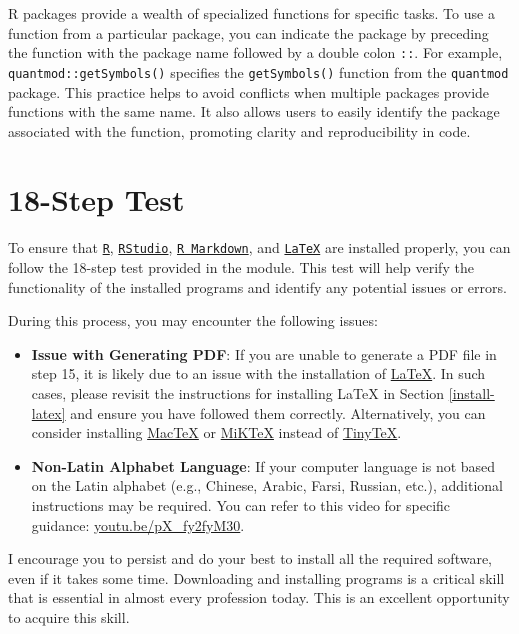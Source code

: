 \documentclass[
]{book}
\begin{document}
R packages provide a wealth of specialized functions for specific tasks. To use a function from a particular package, you can indicate the package by preceding the function with the package name followed by a double colon \texttt{::}. For example, \texttt{quantmod::getSymbols()} specifies the \texttt{getSymbols()} function from the \texttt{quantmod} package. This practice helps to avoid conflicts when multiple packages provide functions with the same name. It also allows users to easily identify the package associated with the function, promoting clarity and reproducibility in code.

\hypertarget{step-test}{%
\section{18-Step Test}\label{step-test}}

To ensure that \href{https://www.r-project.org/}{\texttt{R}}, \href{https://rstudio.com/}{\texttt{RStudio}}, \href{https://rmarkdown.rstudio.com/}{\texttt{R\ Markdown}}, and \href{https://www.latex-project.org/}{\texttt{LaTeX}} are installed properly, you can follow the 18-step test provided in the module. This test will help verify the functionality of the installed programs and identify any potential issues or errors.

During this process, you may encounter the following issues:

\begin{itemize}
\item
  \textbf{Issue with Generating PDF}: If you are unable to generate a PDF file in step 15, it is likely due to an issue with the installation of \href{https://www.latex-project.org/}{LaTeX}. In such cases, please revisit the instructions for installing LaTeX in Section \ref{install-latex} and ensure you have followed them correctly. Alternatively, you can consider installing \href{https://www.tug.org/mactex/}{MacTeX} or \href{https://miktex.org/}{MiKTeX} instead of \href{https://yihui.org/tinytex/}{TinyTeX}.
\item
  \textbf{Non-Latin Alphabet Language}: If your computer language is not based on the Latin alphabet (e.g., Chinese, Arabic, Farsi, Russian, etc.), additional instructions may be required. You can refer to this video for specific guidance: \href{https://youtu.be/pX_fy2fyM30}{youtu.be/pX\_fy2fyM30}.
\end{itemize}

I encourage you to persist and do your best to install all the required software, even if it takes some time. Downloading and installing programs is a critical skill that is essential in almost every profession today. This is an excellent opportunity to acquire this skill.
\end{document}
